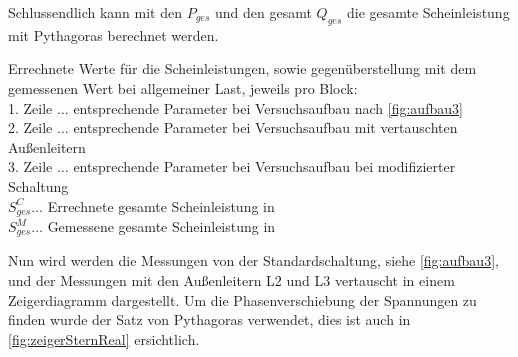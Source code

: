 \documentclass[12pt,english,ngerman]{scrartcl}
\begin{document}
Schlussendlich kann mit den $P_{ges}$ und den gesamt $Q_{ges}$ die gesamte
Scheinleistung mit Pythagoras berechnet werden.

\begin{table}[H]
	\caption[Errechnete Werte für die Scheinleistungen bei allgemeiner Last] { Errechnete
		Werte für die Scheinleistungen, sowie gegenüberstellung mit dem gemessenen Wert
		bei allgemeiner Last, jeweils pro Block:                        \\
		1. Zeile $\dots$ entsprechende Parameter bei Versuchsaufbau nach
		\autoref{fig:aufbau3}                                           \\
		2. Zeile $\dots$ entsprechende Parameter bei Versuchsaufbau mit vertauschten
		Außenleitern                                                    \\
		3. Zeile $\dots$ entsprechende Parameter bei Versuchsaufbau bei modifizierter
		Schaltung                                                       \\
		$S_{ges}^C \dots$ Errechnete gesamte Scheinleistung in \si{\VA} \\
		$S_{ges}^M \dots$ Gemessene gesamte Scheinleistung in \si{\VA}  \\
	}\label{tab:scheinleistung}
	\centering
	
\end{table}

Nun wird werden die Messungen von der Standardschaltung, siehe
\autoref{fig:aufbau3}, und der Messungen mit den Außenleitern L2 und L3
vertauscht in einem Zeigerdiagramm dargestellt. Um die Phasenverschiebung der
Spannungen zu finden wurde der Satz von Pythagoras verwendet, dies ist auch in
\autoref{fig:zeigerSternReal} ersichtlich.
\end{document}
